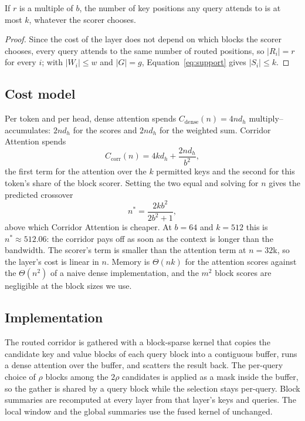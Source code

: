 \begin{proposition}\label{prop:cost}
If $r$ is a multiple of $b$, the number of key positions any query attends
to is at most $k$, whatever the scorer chooses.
\end{proposition}
\begin{proof}
Since the cost of the layer does not depend on which blocks the scorer
chooses, every query attends to the same number of routed positions, so
$|R_i| = r$ for every $i$; with $|W_i| \le w$ and $|G| = g$,
Equation~\eqref{eq:support} gives $|S_i| \le k$.
\end{proof}

\subsection{Cost model}\label{sec:cost}

Per token and per head, dense attention spends
$C_{\mathrm{dense}}(n) = 4 n d_h$ multiply--accumulates: $2 n d_h$ for the
scores and $2 n d_h$ for the weighted sum. Corridor Attention spends
\begin{equation}\label{eq:cost}
  C_{\mathrm{corr}}(n) = 4 k d_h + \frac{2 n d_h}{b^{2}} ,
\end{equation}
the first term for the attention over the $k$ permitted keys and the second
for this token's share of the block scorer. Setting the two equal and
solving for $n$ gives the predicted crossover
\begin{equation}\label{eq:crossover}
  n^{*} = \frac{2 k b^{2}}{2 b^{2} + 1} ,
\end{equation}
above which Corridor Attention is cheaper. At $b = 64$ and $k = 512$ this is
$n^{*} \approx 512.06$: the corridor pays off as soon as the context is
longer than the bandwidth. The scorer's term is smaller than the attention
term at $n = 32$k, so the layer's cost is linear in $n$. Memory is
$\Theta(nk)$ for the attention scores against the $\Theta(n^2)$ of a naive
dense implementation, and the $m^2$ block scores are negligible at the block
sizes we use.

\subsection{Implementation}\label{sec:impl}

The routed corridor is gathered with a block-sparse kernel that copies the
candidate key and value blocks of each query block into a contiguous buffer,
runs a dense attention over the buffer, and scatters the result back. The
per-query choice of $\rho$ blocks among the $2\rho$ candidates is applied as
a mask inside the buffer, so the gather is shared by a query block while the
selection stays per-query. Block summaries are recomputed at every layer
from that layer's keys and queries. The local window and the global
summaries use the fused kernel of \citet{dao2022flashattention} unchanged.

